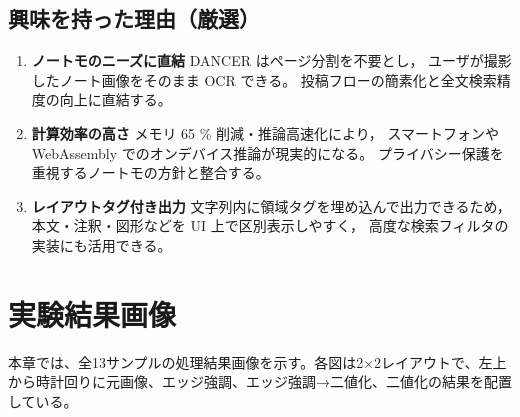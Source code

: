 \documentclass[a4paper,12pt]{jsarticle}
\begin{document}
\subsection{興味を持った理由（厳選）}
\begin{enumerate}
  \item \textbf{ノートモのニーズに直結}  
        DANCER はページ分割を不要とし，
        ユーザが撮影したノート画像をそのまま OCR できる。
        投稿フローの簡素化と全文検索精度の向上に直結する。  

  \item \textbf{計算効率の高さ}  
        メモリ 65 \% 削減・推論高速化により，
        スマートフォンや WebAssembly でのオンデバイス推論が現実的になる。
        プライバシー保護を重視するノートモの方針と整合する。  

  \item \textbf{レイアウトタグ付き出力}  
        文字列内に領域タグを埋め込んで出力できるため，
        本文・注釈・図形などを UI 上で区別表示しやすく，
        高度な検索フィルタの実装にも活用できる。  
\end{enumerate}


\section{実験結果画像}
\label{sec:result_images}

本章では、全13サンプルの処理結果画像を示す。各図は2×2レイアウトで、左上から時計回りに元画像、エッジ強調、エッジ強調→二値化、二値化の結果を配置している。
\end{document}
